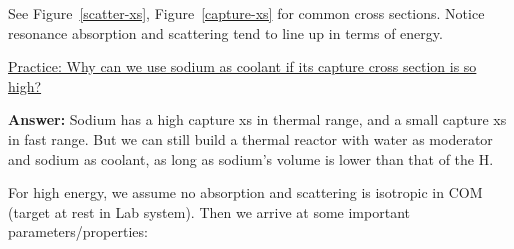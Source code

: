 \documentclass{school-22.211-notes}
\begin{document}
See Figure~\ref{scatter-xs}, Figure~\ref{capture-xs} for common cross sections. Notice resonance absorption and scattering tend to line up in terms of energy. 

\uline{Practice: Why can we use sodium as coolant if its capture cross section is so high?}  

\textbf{Answer:} Sodium has a high capture xs in thermal range, and a small capture xs in fast range. But we can still build a thermal reactor with water as moderator and sodium as coolant, as long as sodium's volume is lower than that of the H. 


\clearpage
For high energy, we assume no absorption and scattering is isotropic in COM (target at rest in Lab system). Then we arrive at some important parameters/properties: 
\end{document}
